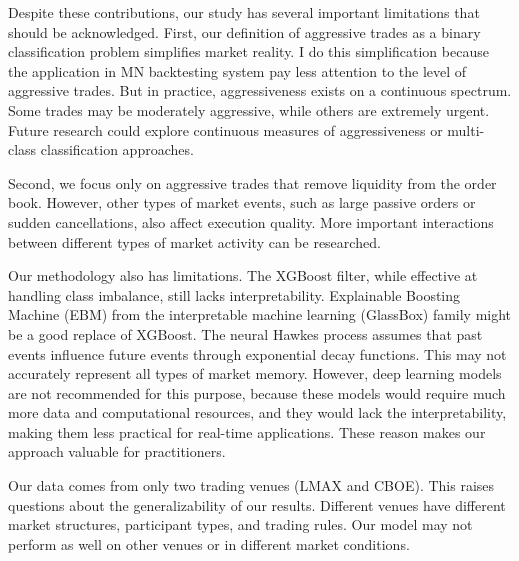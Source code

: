 Despite these contributions, our study has several important limitations that should be acknowledged.
First, our definition of aggressive trades as a binary classification problem simplifies market reality. I do this simplification because the application in MN backtesting system pay less attention to the level of aggressive trades. But in practice, aggressiveness exists on a continuous spectrum. Some trades may be moderately aggressive, while others are extremely urgent. Future research could explore continuous measures of aggressiveness or multi-class classification approaches.

Second, we focus only on aggressive trades that remove liquidity from the order book. However, other types of market events, such as large passive orders or sudden cancellations, also affect execution quality. More important interactions between different types of market activity can be researched.

Our methodology also has limitations. The XGBoost filter, while effective at handling class imbalance, still lacks interpretability. Explainable Boosting Machine (EBM) from the interpretable machine learning (GlassBox) family might be a good replace of XGBoost. 
The neural Hawkes process assumes that past events influence future events through exponential decay functions. This may not accurately represent all types of market memory. However, deep learning models are not recommended for this purpose, because these models would require much more data and computational resources, and they would lack the interpretability, making them less practical for real-time applications. These reason makes our approach valuable for practitioners.

Our data comes from only two trading venues (LMAX and CBOE). This raises questions about the generalizability of our results. Different venues have different market structures, participant types, and trading rules. Our model may not perform as well on other venues or in different market conditions.


